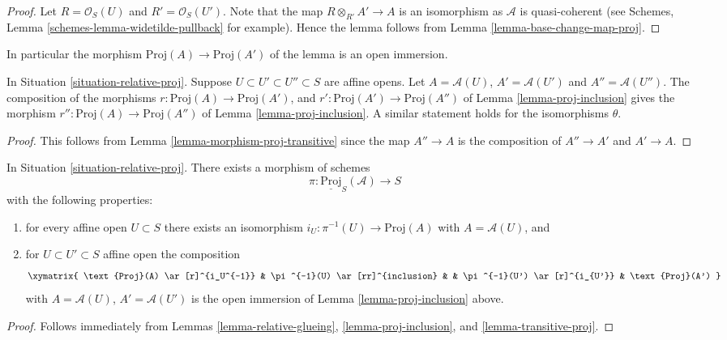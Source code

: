 \begin{proof}
Let $R = \mathcal{O}_S(U)$ and $R' = \mathcal{O}_S(U')$.
Note that the map $R \otimes_{R'} A' \to A$ is an isomorphism as
$\mathcal{A}$ is quasi-coherent
(see Schemes, Lemma \ref{schemes-lemma-widetilde-pullback} for example).
Hence the lemma follows from
Lemma \ref{lemma-base-change-map-proj}.
\end{proof}

\noindent
In particular the morphism $\text{Proj}(A) \to \text{Proj}(A')$
of the lemma is an open immersion.

\begin{lemma}
\label{lemma-transitive-proj}
In Situation \ref{situation-relative-proj}.
Suppose $U \subset U' \subset U'' \subset S$ are affine opens.
Let $A = \mathcal{A}(U)$, $A' = \mathcal{A}(U')$ and $A'' = \mathcal{A}(U'')$.
The composition of the morphisms
$r : \text{Proj}(A) \to \text{Proj}(A')$, and
$r' : \text{Proj}(A') \to \text{Proj}(A'')$ of
Lemma \ref{lemma-proj-inclusion} gives the
morphism $r'' : \text{Proj}(A) \to \text{Proj}(A'')$
of Lemma \ref{lemma-proj-inclusion}. A similar statement
holds for the isomorphisms $\theta$.
\end{lemma}

\begin{proof}
This follows from Lemma \ref{lemma-morphism-proj-transitive} since
the map $A'' \to A$ is the composition of $A'' \to A'$ and
$A' \to A$.
\end{proof}

\begin{lemma}
\label{lemma-glue-relative-proj}
In Situation \ref{situation-relative-proj}.
There exists a morphism of schemes
$$
\pi : \underline{\text{Proj}}_S(\mathcal{A}) \longrightarrow S
$$
with the following properties:
\begin{enumerate}
\item for every affine open $U \subset S$ there exists an isomorphism
$i_U : \pi^{-1}(U) \to \text{Proj}(A)$ with $A = \mathcal{A}(U)$, and
\item for $U \subset U' \subset S$ affine open the composition
$$
\xymatrix{
\text{Proj}(A) \ar[r]^{i_U^{-1}} &
\pi^{-1}(U) \ar[rr]^{inclusion} & &
\pi^{-1}(U') \ar[r]^{i_{U'}} &
\text{Proj}(A')
}
$$
with $A = \mathcal{A}(U)$, $A' = \mathcal{A}(U')$
is the open immersion of Lemma \ref{lemma-proj-inclusion} above.
\end{enumerate}
\end{lemma}

\begin{proof}
Follows immediately from
Lemmas \ref{lemma-relative-glueing},
\ref{lemma-proj-inclusion}, and
\ref{lemma-transitive-proj}.
\end{proof}

